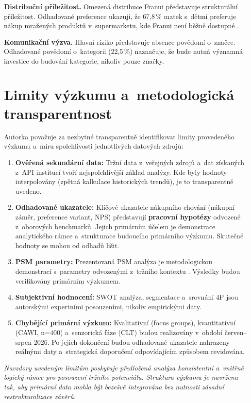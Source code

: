 \textbf{Distribuční příležitost.} Omezená distribuce Franui představuje strukturální příležitost. Odhadované preference ukazují, že 67,8\,\% matek s~dětmi preferuje nákup mražených produktů v~supermarketu, kde Franui není běžně dostupné \parencite{rohlik_franui_2026}.

\textbf{Komunikační výzva.} Hlavní riziko představuje absence povědomí o~značce. Odhadované povědomí o~kategorii (22,5\,\%) naznačuje, že bude nutná významná investice do budování kategorie, nikoliv pouze značky.

\section{Limity výzkumu a~metodologická transparentnost}
\label{sec:res_limits}

Autorka považuje za nezbytné transparentně identifikovat limity provedeného výzkumu a~míru spolehlivosti jednotlivých datových zdrojů:

\begin{enumerate}
  \item \textbf{Ověřená sekundární data:} Tržní data z~veřejných zdrojů \parencite{frozenfoodeurope_2025, czso_spotreba_2024, usda_fas_2025} a~dat získaných z~API institucí \parencite{cnb_kurzy_2026, worldbank_gdp_2026} tvoří nejspolehlivější základ analýzy. Kde byly hodnoty interpolovány (zpětná kalkulace historických trendů), je to transparentně uvedeno.

  \item \textbf{Odhadované ukazatele:} Klíčové ukazatele nákupního chování (nákupní záměr, preference variant, NPS) představují \textbf{pracovní hypotézy} odvozené z~oborových benchmarků. Jejich primárním účelem je demonstrace analytického rámce a~strukturace budoucího primárního výzkumu. Skutečné hodnoty se mohou od odhadů lišit.

  \item \textbf{PSM parametry:} Prezentovaná PSM analýza je metodologickou demonstrací s~parametry odvozenými z~tržního kontextu \parencite{vanwestendorp_1976}. Výsledky budou verifikovány primárním výzkumem.

  \item \textbf{Subjektivní hodnocení:} SWOT analýza, segmentace a~srovnání 4P jsou autorskými expertními posouzeními, nikoliv empirickými daty.

  \item \textbf{Chybějící primární výzkum:} Kvalitativní (focus groups), kvantitativní (CAWI, n=400) a~senzorická fáze (CLT) budou realizovány v~období červen--srpen 2026. Po jejich dokončení budou odhadované ukazatele nahrazeny reálnými daty a~strategická doporučení odpovídajícím způsobem revidována.
\end{enumerate}

\textit{Navzdory uvedeným limitům poskytuje předložená analýza konzistentní a~vnitřně logický rámec pro posouzení tržního potenciálu. Struktura výzkumu je navržena tak, aby primární data mohla být bezešvě integrována bez nutnosti zásadní restrukturalizace závěrů.}
